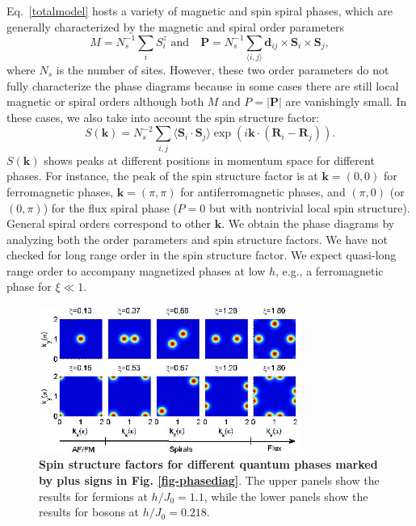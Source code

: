 \documentclass[a4paper,showpacs]{revtex4}
\begin{document}
Eq.~\ref{totalmodel} hosts a variety of magnetic and spin spiral phases,
which are generally characterized by the magnetic and spiral order
parameters \cite{Mostovoy, Nagaosa}
\begin{equation}
M=N_{s}^{-1} \sum_{i}S_{i}^{z}\text{ and}\quad \mathbf{P}=N_{s}^{-1} \sum_{\langle i,j\rangle }%
\mathbf{d}_{ij}\times \mathbf{S}_{i}\times \mathbf{S}_{j},
\end{equation}%
where $N_{s}$ is the number of sites. However, these two order parameters do not fully characterize the phase
diagrams because in some cases there are still local magnetic or spiral
orders although both $M$ and $P=|\mathbf{P}|$ are vanishingly small. In
these cases, we also take into account the spin structure factor:
\begin{equation}
S(\mathbf{k})=N_{s}^{-2}\sum_{i,j}\langle \mathbf{S}_{i}\cdot \mathbf{S}_{j}\rangle
\exp (i\mathbf{k}\cdot (\mathbf{R}_{i}-\mathbf{R}_{j})).
\end{equation}%
$S(\mathbf{k})$ shows peaks at different positions in momentum space for different
phases. For instance, the peak of the spin structure factor is at $\mathbf{k}%
=(0,0)$ for ferromagnetic phases, $\mathbf{k}=(\pi ,\pi )$ for
antiferromagnetic phases, and $(\pi ,0)$ (or $(0,\pi )$) for the flux spiral
phase ($P=0$ but with nontrivial local spin structure). General spiral
orders correspond to other $\mathbf{k}$. We obtain the phase diagrams by
analyzing both the order parameters and spin structure factors. We have not
checked for long range order in the spin structure factor. We expect
quasi-long range order to accompany magnetized phases at low $h$, e.g., a
ferromagnetic phase for $\xi \ll 1$.

\begin{figure}[t]
\centering
\includegraphics[width=3.4in]{spin_structures_factor_2}
\caption{{\bf\sffamily Spin structure factors for different quantum phases marked by plus
signs in Fig. \protect\ref{fig-phasediag}}. The upper panels show the results
for fermions at $h/J_{0}=1.1$, while the lower panels show the results for
bosons at $h/J_{0}=0.218$. }
\label{fig-ss}
\end{figure}
\end{document}
